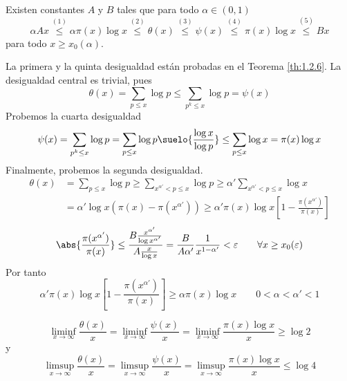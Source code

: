 \documentclass[TAN.tex]{subfiles}
\begin{document}
\begin{teorema}[Chebyshev]
Existen constantes $A$ y $B$ tales que para todo $α \in (0,1)$
\[ αAx \overset{(1)}{\leq} απ(x)\log x \overset{(2)}{\leq}  θ(x) \overset{(3)}{\leq}  ψ(x) \overset{(4)}{\leq}  π(x)\log x \overset{(5)}{\leq}  Bx \]
para todo $x ≥ x_0(α)$.
\end{teorema}
\begin{dem}
La primera y la quinta desigualdad están probadas en el Teorema \ref{th:1.2.6}. La desigualdad central es trivial, pues
$$
\theta(x) = \sum_{p\leq x}\log p \leq \sum_{p^k\leq x} \log p = \psi(x)
$$
Probemos la cuarta desigualdad
$$
\psi(x)=\sum_{p^k\leq x} \log p = \sum_{p\leq x} \log p \suelo{\frac{\log x}{\log p}} \leq \sum_{p\leq x} \log x = \pi(x)\log x
$$
Finalmente, probemos la segunda desigualdad.
\begin{align*}
\theta(x)&=\sum_{p\leq x}\log p \geq \sum_{x^{\alpha'}<p\leq x}\log p \geq \alpha'\sum_{x^{\alpha'}<p\leq x}\log x \\
&= \alpha'\log x (\pi(x)-\pi(x^{\alpha'}))\geq \alpha'\pi(x)\log x \left[1-\frac{\pi(x^{\alpha'})}{\pi(x)}\right]
\end{align*}
$$
\abs{\frac{\pi(x^{\alpha'})}{\pi(x)}}\leq \frac{B\frac{x^{\alpha'}}{\log x^{\alpha'}}}{A\frac{x}{\log x}} = \frac{B}{A\alpha'}\frac{1}{x^{1-\alpha'}}<\varepsilon \qquad \forall x\geq x_0(\varepsilon) 
$$
Por tanto
$$
\alpha'\pi(x)\log x \left[1-\frac{\pi(x^{\alpha'})}{\pi(x)}\right] \geq \alpha\pi(x)\log x \qquad 0<\alpha<\alpha'<1
$$
\end{dem}
\begin{teorema}[Chebyshev]
\[ \liminf_{x\to∞} \frac{θ(x)}{x} = \liminf_{x\to∞} \frac{ψ(x)}{x} = \liminf_{x\to∞} \frac{π(x)\log x}{x} ≥ \log 2 \]
y
\[ \limsup_{x\to∞} \frac{θ(x)}{x} = \limsup_{x\to∞} \frac{ψ(x)}{x} = \limsup_{x\to∞} \frac{π(x)\log x}{x} ≤ \log 4 \]
\end{teorema}
\end{document}
